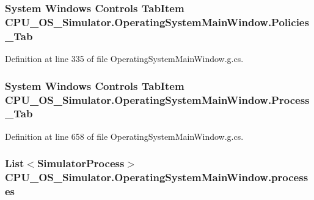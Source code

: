 \subsubsection[{Policies\+\_\+\+Tab}]{\setlength{\rightskip}{0pt plus 5cm}System Windows Controls Tab\+Item C\+P\+U\+\_\+\+O\+S\+\_\+\+Simulator.\+Operating\+System\+Main\+Window.\+Policies\+\_\+\+Tab\hspace{0.3cm}{\ttfamily [package]}}\label{class_c_p_u___o_s___simulator_1_1_operating_system_main_window_a019542a100cb475965f111d94085a16a}


Definition at line 335 of file Operating\+System\+Main\+Window.\+g.\+cs.

\hypertarget{class_c_p_u___o_s___simulator_1_1_operating_system_main_window_a01c2d1944c9470e56e5bbbcdff683f2b}{}
\subsubsection[{Process\+\_\+\+Tab}]{\setlength{\rightskip}{0pt plus 5cm}System Windows Controls Tab\+Item C\+P\+U\+\_\+\+O\+S\+\_\+\+Simulator.\+Operating\+System\+Main\+Window.\+Process\+\_\+\+Tab\hspace{0.3cm}{\ttfamily [package]}}\label{class_c_p_u___o_s___simulator_1_1_operating_system_main_window_a01c2d1944c9470e56e5bbbcdff683f2b}


Definition at line 658 of file Operating\+System\+Main\+Window.\+g.\+cs.

\hypertarget{class_c_p_u___o_s___simulator_1_1_operating_system_main_window_ab6bcbc8c33ec438d2f005d4c978e1a44}{}
\subsubsection[{processes}]{\setlength{\rightskip}{0pt plus 5cm}List$<${\bf Simulator\+Process}$>$ C\+P\+U\+\_\+\+O\+S\+\_\+\+Simulator.\+Operating\+System\+Main\+Window.\+processes\hspace{0.3cm}{\ttfamily [private]}}\label{class_c_p_u___o_s___simulator_1_1_operating_system_main_window_ab6bcbc8c33ec438d2f005d4c978e1a44}


